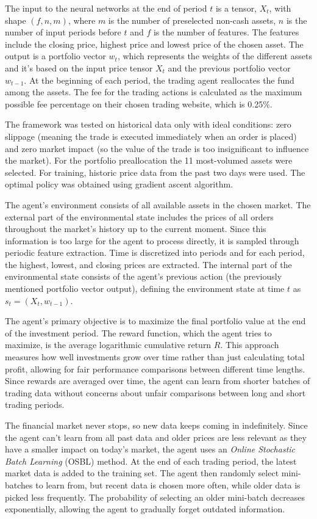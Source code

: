 \documentclass[a4paper,oneside,onecolumn,12pt]{book}
\begin{document}
	The input to the neural networks at the end of period $t$ is a tensor, $X_t$, with shape $(f,n,m)$, where $m$ is the number of preselected non-cash assets, $n$ is the number of input periods before $t$ and $f$ is the number of features. The features include the closing price, highest price and lowest price of the chosen asset. The output is a portfolio vector $w_t$, which represents the weights of the different assets and it's based on the input price tensor $X_t$ and the previous portfolio vector $w_{t-1}$. At the beginning of each period, the trading agent reallocates the fund among the assets. The fee for the trading actions is calculated as the maximum possible fee percentage on their chosen trading website, which is 0.25\%. 

	The framework was tested on historical data only with ideal conditions: zero slippage (meaning the trade is executed immediately when an order is placed) and zero market impact (so the value of the trade is too insignificant to influence the market). For the portfolio preallocation the 11 most-volumed assets were selected. For training, historic price data from the past two days were used. The optimal policy was obtained using gradient ascent algorithm.

	The agent's environment consists of all available assets in the chosen market. The external part of the environmental state includes the prices of all orders throughout the market's history up to the current moment. Since this information is too large for the agent to process directly, it is sampled through periodic feature extraction. Time is discretized into periods and for each period, the highest, lowest, and closing prices are extracted. The internal part of the environmental state consists of the agent's previous action (the previously mentioned portfolio vector output), defining the environment state at time $t$ as $s_t = (X_t, w_{t-1})$.

	The agent's primary objective is to maximize the final portfolio value at the end of the investment period. The reward function, which the agent tries to maximize, is the average logarithmic cumulative return $R$. This approach measures how well investments grow over time rather than just calculating total profit, allowing for fair performance comparisons between different time lengths. Since rewards are averaged over time, the agent can learn from shorter batches of trading data without concerns about unfair comparisons between long and short trading periods.

	The financial market never stops, so new data keeps coming in indefinitely. Since the agent can't learn from all past data and older prices are less relevant as they have a smaller impact on today's market, the agent uses an \textit{Online Stochastic Batch Learning} (OSBL) method. At the end of each trading period, the latest market data is added to the training set. The agent then randomly select mini-batches to learn from, but recent data is chosen more often, while older data is picked less frequently. The probability of selecting an older mini-batch decreases exponentially, allowing the agent to gradually forget outdated information.
\end{document}
